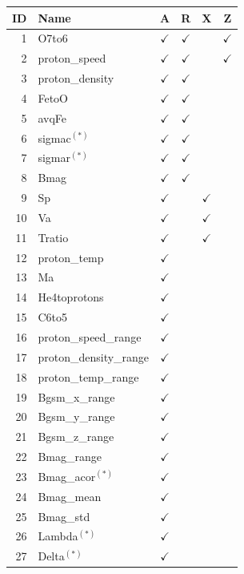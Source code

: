 \documentclass[utf8]{frontiersSCNS} %
\begin{document}
\begin{table}\centering
	\begin{tabular}{@{}rlcccc@{}}
		\toprule
		ID & Name  & A & R & X & Z \\
		\midrule
		1 & O7to6 & $\checkmark$ & $\checkmark$ & & $\checkmark$ \\
		2 & proton\_speed & $\checkmark$ & $\checkmark$ & & $\checkmark$ \\
		3 & proton\_density & $\checkmark$ & $\checkmark$ & & \\
		4 & FetoO & $\checkmark$ & $\checkmark$ & & \\
		5 & avqFe & $\checkmark$ & $\checkmark$ & & \\
		6 & sigmac$^{(*)}$ & $\checkmark$ & $\checkmark$ & & \\
		7 & sigmar$^{(*)}$ & $\checkmark$ & $\checkmark$ & & \\
		8 & Bmag & $\checkmark$ & $\checkmark$ & & \\
		9 & Sp & $\checkmark$ & & $\checkmark$ & \\
		10 & Va & $\checkmark$ & &$\checkmark$ & \\
		11 & Tratio & $\checkmark$ & & $\checkmark$ & \\
		12 & proton\_temp & $\checkmark$ & & & \\
		13 & Ma & $\checkmark$ & & & \\
		14 & He4toprotons & $\checkmark$ & & & \\
		15 & C6to5 & $\checkmark$ & & & \\
		16 & proton\_speed\_range & $\checkmark$ & & & \\
		17 & proton\_density\_range & $\checkmark$ & & & \\
		18 & proton\_temp\_range & $\checkmark$ & & & \\
		19 & Bgsm\_x\_range & $\checkmark$ & & & \\
		20 & Bgsm\_y\_range & $\checkmark$ & & & \\
		21 & Bgsm\_z\_range & $\checkmark$ & & & \\
		22 & Bmag\_range & $\checkmark$ & & & \\
		23 & Bmag\_acor$^{(*)}$ & $\checkmark$ & & & \\
		24 & Bmag\_mean & $\checkmark$ & & & \\
		25 & Bmag\_std & $\checkmark$ & & & \\
		26 & Lambda$^{(*)}$ & $\checkmark$ & & & \\
		27 & Delta$^{(*)}$ & $\checkmark$ & & & \\

\end{tabular}
\end{table}
\end{document}
